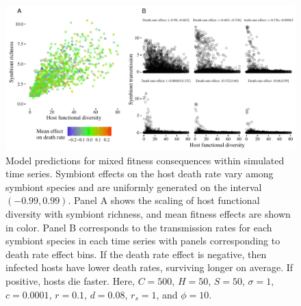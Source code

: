 \begin{figure}[ht]\centering
\includegraphics[width=\textwidth,height=\dimexpr\textheight-4\baselineskip-\abovecaptionskip-\belowcaptionskip\relax,
keepaspectratio]{figs/ch6/fig5.pdf}
\caption[Predictions when fitness consequences vary within communities]{Model predictions for mixed fitness consequences within simulated time series. Symbiont effects on the host death rate vary among symbiont species and are uniformly generated on the interval $(-0.99, 0.99)$. Panel A shows the scaling of host functional diversity with symbiont richness, and mean fitness effects are shown in color. Panel B corresponds to the transmission rates for each symbiont species in each time series with panels corresponding to death rate effect bins. If the death rate effect is negative, then infected hosts have lower death rates, surviving longer on average. If positive, hosts die faster. Here, $C=500$, $H=50$, $S=50$, $\sigma = 1$, $c=0.0001$, $r=0.1$, $d=0.08$, $r_s=1$, and $\phi = 10$.}
\label{f6}
\end{figure}

